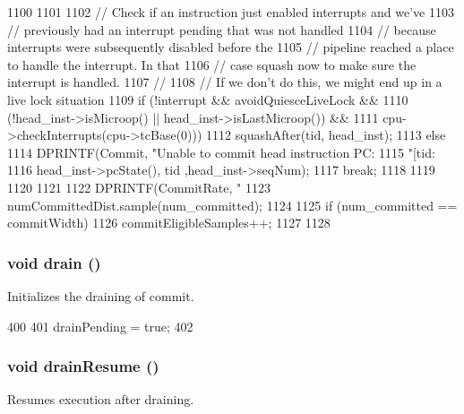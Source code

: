 \begin{DoxyCode}
{{{{{1100                 }
1101 
1102                 // Check if an instruction just enabled interrupts and we've
1103                 // previously had an interrupt pending that was not handled
1104                 // because interrupts were subsequently disabled before the
1105                 // pipeline reached a place to handle the interrupt. In that
1106                 // case squash now to make sure the interrupt is handled.
1107                 //
1108                 // If we don't do this, we might end up in a live lock situation
1109                 if (!interrupt  && avoidQuiesceLiveLock &&
1110                    (!head_inst->isMicroop() || head_inst->isLastMicroop()) &&
1111                    cpu->checkInterrupts(cpu->tcBase(0)))
1112                     squashAfter(tid, head_inst);
1113             } else {
1114                 DPRINTF(Commit, "Unable to commit head instruction PC:%
1115                         "[tid:%
1116                         head_inst->pcState(), tid ,head_inst->seqNum);
1117                 break;
1118             }
1119         }
1120     }
1121 
1122     DPRINTF(CommitRate, "%
1123     numCommittedDist.sample(num_committed);
1124 
1125     if (num_committed == commitWidth) {
1126         commitEligibleSamples++;
1127     }
1128 }
\end{DoxyCode}
\hypertarget{classDefaultCommit_af7d01b5776b9d8a0f218aec331ddaeb9}{
\subsubsection[{drain}]{\setlength{\rightskip}{0pt plus 5cm}void drain ()}}
\label{classDefaultCommit_af7d01b5776b9d8a0f218aec331ddaeb9}
Initializes the draining of commit. 


\begin{DoxyCode}
400 {
401     drainPending = true;
402 }
\end{DoxyCode}
\hypertarget{classDefaultCommit_a8f020d3237536fe007fc488c4125c5d8}{
\subsubsection[{drainResume}]{\setlength{\rightskip}{0pt plus 5cm}void drainResume ()}}
\label{classDefaultCommit_a8f020d3237536fe007fc488c4125c5d8}
Resumes execution after draining. 


